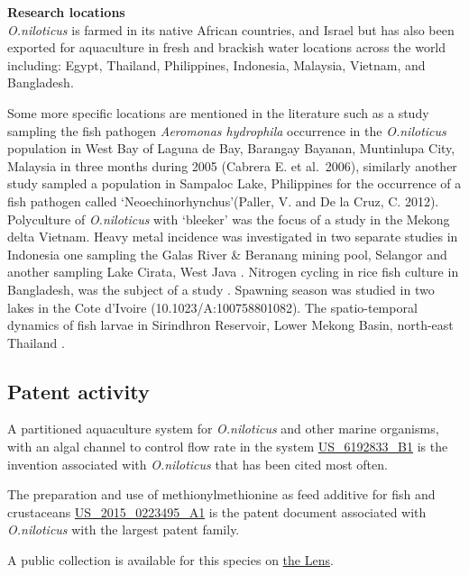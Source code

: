 \documentclass[]{book}
\theoremstyle{definition}
\theoremstyle{definition}
\theoremstyle{definition}
\theoremstyle{remark}
\begin{document}
\textbf{Research locations}\\
\emph{O.niloticus} is farmed in its native African countries, and Israel
but has also been exported for aquaculture in fresh and brackish water
locations across the world including: Egypt, Thailand, Philippines,
Indonesia, Malaysia, Vietnam, and Bangladesh.

Some more specific locations are mentioned in the literature such as a
study sampling the fish pathogen \emph{Aeromonas hydrophila} occurrence
in the \emph{O.niloticus} population in West Bay of Laguna de Bay,
Barangay Bayanan, Muntinlupa City, Malaysia in three months during 2005
(Cabrera E. et al.~2006), similarly another study sampled a population
in Sampaloc Lake, Philippines for the occurrence of a fish pathogen
called `Neoechinorhynchus'(Paller, V. and De la Cruz, C. 2012).
Polyculture of \emph{O.niloticus} with `bleeker' was the focus of a
study in the Mekong delta Vietnam. Heavy metal incidence was
investigated in two separate studies in Indonesia one sampling the Galas
River \& Beranang mining pool, Selangor and another sampling Lake
Cirata, West Java \citep{Baharom_2015, Salami_2008}. Nitrogen cycling in
rice fish culture in Bangladesh, was the subject of a study
\citep{Oehme_2007}. Spawning season was studied in two lakes in the Cote
d'Ivoire (10.1023/A:100758801082). The spatio-temporal dynamics of fish
larvae in Sirindhron Reservoir, Lower Mekong Basin, north-east Thailand
\citep{Jutagate_2016}.

\hypertarget{patent-activity-5}{%
\subsection{Patent activity}\label{patent-activity-5}}

A partitioned aquaculture system for \emph{O.niloticus} and other marine
organisms, with an algal channel to control flow rate in the system
\href{https://www.lens.org/lens/patent/US_6192833_B1}{US\_6192833\_B1}
is the invention associated with \emph{O.niloticus} that has been cited
most often.

The preparation and use of methionylmethionine as feed additive for fish
and crustaceans
\href{https://www.lens.org/lens/patent/US_2015_0223495_A1}{US\_2015\_0223495\_A1}
is the patent document associated with \emph{O.niloticus} with the
largest patent family.

A public collection is available for this species on
\href{https://www.lens.org/lens/collection/24913}{the Lens}.
\end{document}
